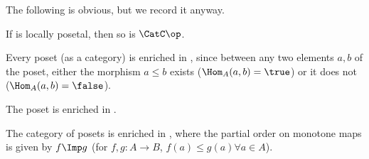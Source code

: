 %
The following is obvious, but we record it anyway.
\begin{lemma}
	\label{lem:loc_pos_op}
	If \CatC is locally posetal, then so is $\CatC\op$.
\end{lemma}

\begin{example}
	\label{ex:enrichbool}
	Every poset (as a category) is enriched in \Bool, since between any two elements $a,b$ of the poset, either the morphism $a \leq b$ exists ($\Hom_A(a,b) = \true$) or it does not ($\Hom_A(a,b) = \false$).
\end{example}

\begin{example}
	The poset \Bool is enriched in \Bool.
\end{example}

\begin{example}
	The category \Pos of posets is enriched in \Pos, where the partial order on monotone maps is given by $f \Imp g$ (\ie  for $f,g : A \to B$, $f(a) \leq g(a) \forall a \in A$).
\end{example}

%

